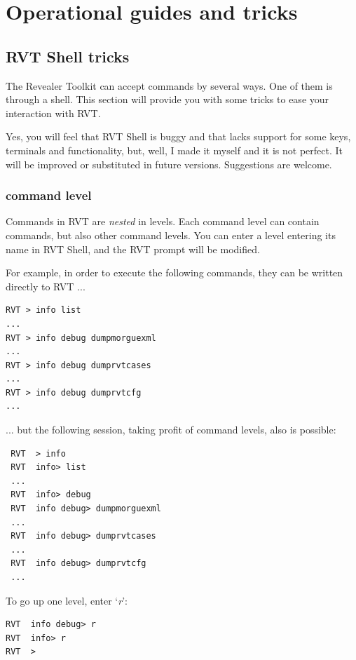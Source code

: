 \documentclass[a4paper,11pt,oneside]{report}
\begin{document}
\chapter{Operational guides and tricks}



\section{RVT Shell tricks}

The Revealer Toolkit can accept commands by several ways. One of them is through a shell. This section will provide you with some tricks to ease your interaction with RVT.

Yes, you will feel that RVT Shell is buggy and that lacks support for some keys, terminals and functionality, but, well, I made it myself and it is not perfect. It will be improved or substituted in future versions. Suggestions are welcome.


\subsection{command level}

Commands in RVT are \emph{nested} in levels. Each command level can contain commands, but also other command levels. You can enter a level entering its name in RVT Shell, and the RVT prompt will be modified.

For example, in order to execute the following commands, they can be written directly to RVT ...

\begin{verbatim}
RVT > info list
...
RVT > info debug dumpmorguexml
...
RVT > info debug dumprvtcases
...
RVT > info debug dumprvtcfg
...
\end{verbatim}


... but the following session, taking profit of command levels, also is possible:

\begin{verbatim}
 RVT  > info 
 RVT  info> list
 ...  
 RVT  info> debug
 RVT  info debug> dumpmorguexml
 ...
 RVT  info debug> dumprvtcases
 ...
 RVT  info debug> dumprvtcfg
 ...
\end{verbatim}


To go up one level, enter `\emph{r}':

\begin{verbatim}
RVT  info debug> r
RVT  info> r
RVT  > 
\end{verbatim}
\end{document}
